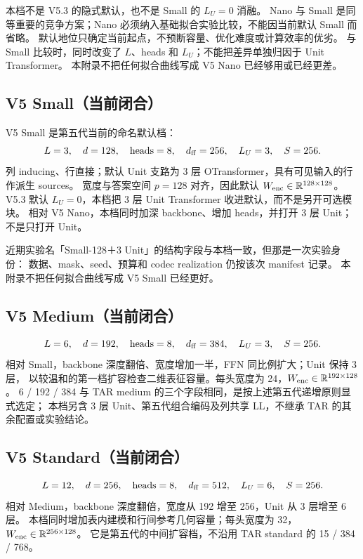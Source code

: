 \documentclass[11pt,UTF8,fontset=fandol]{ctexart}
\numberwithin{equation}{section}
\theoremstyle{definition}
\newcommand{\R}{\mathbb R}
\begin{document}
本档不是 V5.3 的隐式默认，也不是 Small 的 $L_U=0$ 消融。
Nano 与 Small 是同等重要的竞争方案；Nano 必须纳入基础拟合实验比较，不能因当前默认 Small 而省略。
默认地位只确定当前起点，不预断容量、优化难度或计算效率的优劣。
与 Small 比较时，同时改变了 $L$、heads 和 $L_U$；不能把差异单独归因于 Unit Transformer。
本附录不把任何拟合曲线写成 V5 Nano 已经够用或已经更差。

\subsection{V5 Small（当前闭合）}
\label{v54:subsec:size-small}
V5 Small 是第五代当前的命名默认档：
\begin{equation}
 L=3,\quad d=128,\quad \mathrm{heads}=8,\quad
 d_{\rm ff}=256,\quad L_U=3,\quad S=256.
 \label{v54:eq:v5-small}
\end{equation}
列 inducing、行直接；默认 Unit 支路为 3 层 OTransformer，具有可见输入的行作派生 sources。
宽度与答案空间 $p=128$ 对齐，因此默认 $W_{\rm enc}\in\R^{128\times128}$。
V5.3 默认 $L_U=0$，本档把 3 层 Unit Transformer 收进默认，而不是另开可选模块。
相对 V5 Nano，本档同时加深 backbone、增加 heads，并打开 3 层 Unit；不是只打开 Unit。

近期实验名「Small-128＋3 Unit」的结构字段与本档一致，但那是一次实验身份：
数据、mask、seed、预算和 codec realization 仍按该次 manifest 记录。
本附录不把任何拟合曲线写成 V5 Small 已经更好。

\subsection{V5 Medium（当前闭合）}
\label{v54:subsec:size-medium}
\begin{equation}
 L=6,\quad d=192,\quad \mathrm{heads}=8,\quad
 d_{\rm ff}=384,\quad L_U=3,\quad S=256.
 \label{v54:eq:v5-medium}
\end{equation}
相对 Small，backbone 深度翻倍、宽度增加一半，FFN 同比例扩大；Unit 保持 3 层，
以较温和的第一档扩容检查二维表征容量。每头宽度为 24，$W_{\rm enc}\in\R^{192\times128}$。
6 / 192 / 384 与 TAR medium 的三个字段相同，是按上述第五代递增原则显式选定；
本档另含 3 层 Unit、第五代组合编码及列共享 LL，不继承 TAR 的其余配置或实验结论。

\subsection{V5 Standard（当前闭合）}
\label{v54:subsec:size-standard}
\begin{equation}
 L=12,\quad d=256,\quad \mathrm{heads}=8,\quad
 d_{\rm ff}=512,\quad L_U=6,\quad S=256.
 \label{v54:eq:v5-standard}
\end{equation}
相对 Medium，backbone 深度翻倍，宽度从 192 增至 256，Unit 从 3 层增至 6 层。
本档同时增加表内建模和行间参考几何容量；每头宽度为 32，$W_{\rm enc}\in\R^{256\times128}$。
它是第五代的中间扩容档，不沿用 TAR standard 的 15 / 384 / 768。
\end{document}
